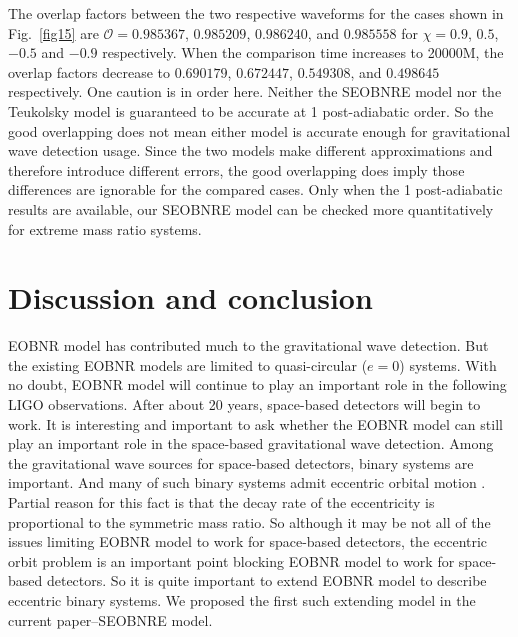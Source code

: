 \documentclass[prd,aps,a4paper,superscriptaddress,twocolumn,footinbib,showpacs]{revtex4}
\begin{document}
The overlap factors between the two respective waveforms for the cases shown in Fig.~\ref{fig15} are $\mathcal{O}=0.985367$, $0.985209$, $0.986240$, and $0.985558$ for $\chi=0.9$, $0.5$, $-0.5$ and $-0.9$ respectively. When the comparison time increases to 20000M, the overlap factors decrease to $0.690179$, $0.672447$, $0.549308$, and $0.498645$ respectively. One caution is in order here. Neither the SEOBNRE model nor the Teukolsky model is guaranteed to be accurate at 1 post-adiabatic order. So the good overlapping does not mean either model is accurate enough for gravitational wave detection usage. Since the two models make different
approximations and therefore introduce different errors, the good overlapping does imply those differences are ignorable for the compared cases. Only when the 1 post-adiabatic results are available, our SEOBNRE model can be checked more quantitatively for extreme mass ratio systems.
\section{Discussion and conclusion}\label{sec::discussion}
EOBNR model has contributed much to the gravitational wave detection. But the existing EOBNR models are limited to quasi-circular ($e=0$) systems. With no doubt, EOBNR model will continue to play an important role in the following LIGO observations. After about 20 years, space-based detectors will begin to work. It is interesting and important to ask whether the EOBNR model can still play an important role in the space-based gravitational wave detection. Among the gravitational wave sources for space-based detectors, binary systems are important. And many of such binary systems admit eccentric orbital motion \cite{0264-9381-24-17-R01}. Partial reason for this fact is that the decay rate of the eccentricity is proportional to the symmetric mass ratio. So although it may be not all of the issues limiting EOBNR model to work for space-based detectors, the eccentric orbit problem is an important point blocking EOBNR model to work for space-based detectors. So it is quite important to extend EOBNR model to describe eccentric binary systems. We proposed the first such extending model in the current paper--SEOBNRE model.
\end{document}
